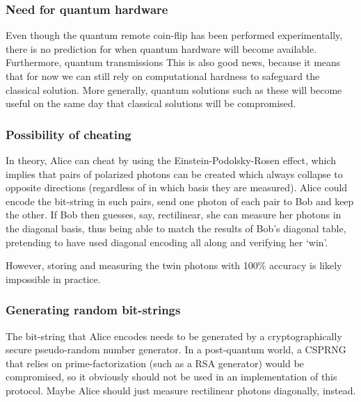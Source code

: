 \documentclass[oneside,a4paper]{article}
\begin{document}
\subsubsection{Need for quantum hardware} %
Even though the quantum remote coin-flip has been performed experimentally, there is no prediction for when quantum hardware will become available.
Furthermore, quantum transmissions 
This is also good news, because it means that for now we can still rely on computational hardness to safeguard the classical solution.
More generally, quantum solutions such as these will become useful on the same day that classical solutions will be compromised.

\subsubsection{Possibility of cheating}
In theory, Alice can cheat by using the Einstein-Podolsky-Rosen effect, which implies that pairs of polarized photons can be created which always collapse to opposite directions (regardless of in which basis they are measured).
Alice could encode the bit-string in such pairs, send one photon of each pair to Bob and keep the other.
If Bob then guesses, say, rectilinear, she can measure her photons in the diagonal basis, thus being able to match the results of Bob's diagonal table, pretending to have used diagonal encoding all along and verifying her `win'.

However, storing and measuring the twin photons with 100\% accuracy is likely impossible in practice.

\subsubsection{Generating random bit-strings}
The bit-string that Alice encodes needs to be generated by a cryptographically secure pseudo-random number generator.
In a post-quantum world, a CSPRNG that relies on prime-factorization (such as a RSA generator) would be compromised, so it obviously should not be used in an implementation of this protocol.
Maybe Alice should just measure rectilinear photons diagonally, instead.





\end{document}
